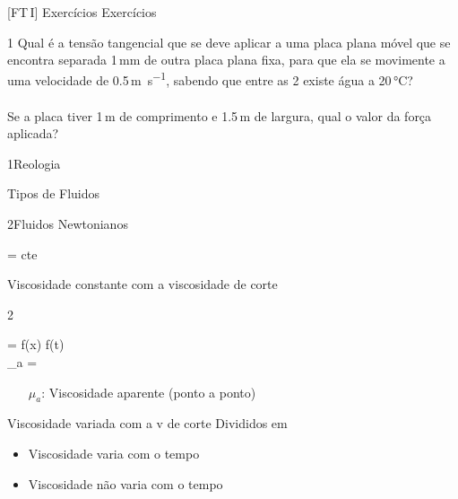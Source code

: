 \documentclass[\mainfilename]{subfiles}
\begin{document}
[FT\,I]
{Exercícios}
{Exercícios}

\setcounter{part}{2}


\begin{questionBox}1{
    Qual é a tensão tangencial que se deve aplicar a uma placa plana móvel que se encontra separada 1\,\unit{\milli\metre} de outra placa plana fixa, para que ela se movimente a uma velocidade de 0.5\,\unit{\metre\per\second}, sabendo que entre as 2 existe água a 20\,\unit{\celsius}?\\\\
    Se a placa tiver 1\,\unit{\metre} de comprimento e 1.5\,\unit{\metre} de largura, qual o valor da força aplicada?
} %
    
\end{questionBox}

\begin{sectionBox}1{Reologia}
    
    Tipos de Fluidos
    
    \begin{sectionBox}2{Fluidos Newtonianos}
        
        \begin{BM}
             = cte
        \end{BM}

        Viscosidade constante com a viscosidade de corte
        
    \end{sectionBox}

    \begin{sectionBox}2{}

        \begin{BM}
             = f(x) \lor f(t)
            \\
            \mu_a = 
        \end{BM}
        \begin{itemize}
            \item[\(\mu_a\):] Viscosidade aparente (ponto a ponto)
        \end{itemize}
        
        Viscosidade variada com a v de corte
        Divididos em
        \begin{itemize}
            \item Viscosidade varia com o tempo
            \item Viscosidade não varia com o tempo
        \end{itemize}
        
    \end{sectionBox}
    
\end{sectionBox}
\end{document}
